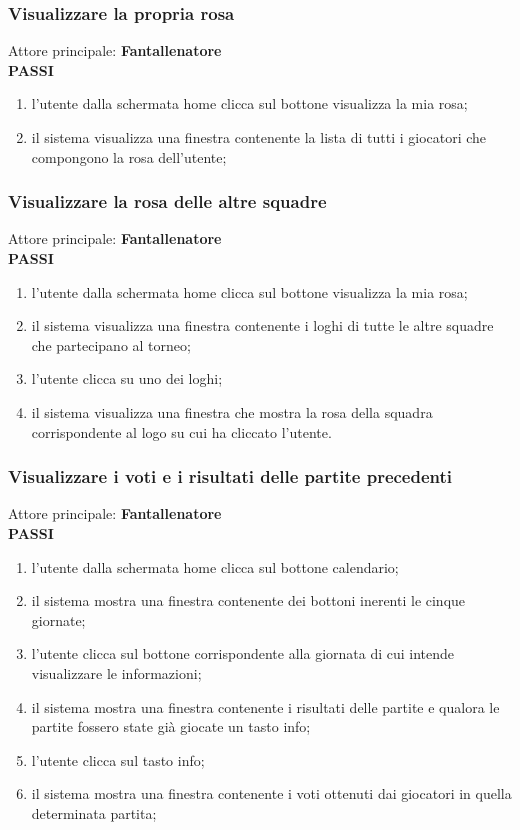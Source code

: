\documentclass[12pt,a4paper]{article}
\begin{document}
\subsubsection{Visualizzare la propria rosa}
Attore principale: \textbf{Fantallenatore}\\
\newline
\textbf{PASSI}
\begin{enumerate}
\item l'utente dalla schermata home clicca sul bottone visualizza la mia rosa;
\item il sistema visualizza una finestra contenente la lista di tutti i giocatori che compongono la rosa dell'utente;
\end{enumerate}
\subsubsection{Visualizzare la rosa delle altre squadre}
Attore principale: \textbf{Fantallenatore}\\
\newline
\textbf{PASSI}
\begin{enumerate}
\item l'utente dalla schermata home clicca sul bottone visualizza la mia rosa;
\item il sistema visualizza una finestra contenente i loghi di tutte le altre squadre che partecipano al torneo;
\item l'utente clicca su uno dei loghi;
\item il sistema visualizza una finestra che mostra la rosa della squadra corrispondente al logo su cui ha cliccato l'utente.
\end{enumerate}
\subsubsection{Visualizzare i voti e i risultati delle partite precedenti}
Attore principale: \textbf{Fantallenatore}\\
\newline
\textbf{PASSI}
\begin{enumerate}
\item l'utente dalla schermata home clicca sul bottone calendario;
\item il sistema mostra una finestra contenente dei bottoni inerenti le cinque giornate;
\item l'utente clicca sul bottone corrispondente alla giornata di cui intende visualizzare le informazioni;
\item il sistema mostra una finestra contenente i risultati delle partite e qualora le partite fossero state già giocate un tasto info;
\item l'utente clicca sul tasto info;
\item il sistema mostra una finestra contenente i voti ottenuti dai giocatori in quella determinata partita; 
\end{enumerate}
\end{document}
